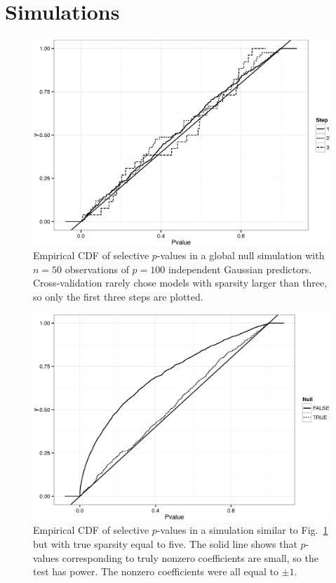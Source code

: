 \documentclass[preprint]{imsart}
\begin{document}
\section{Simulations}

\begin{figure}[h!]
  \centering
  \includegraphics[width=\textwidth]{results_cv_n50_p100_sparsity0_snr0_bystep.eps}
  \caption{\footnotesize Empirical CDF of selective $p$-values in a
    global null simulation
  with $n = 50$ observations of $p = 100$ independent Gaussian predictors.
  Cross-validation rarely chose models with sparsity larger than three,
  so only the first three steps are plotted.}
  \label{fig:globalnull}
\end{figure}


\begin{figure}[h!]
  \centering
  \includegraphics[width=\textwidth]{results_cv_n50_p100_sparsity5_snr1_bynull.eps}
  \caption{\footnotesize Empirical CDF of selective $p$-values in a
  simulation similar to Fig.~\ref{fig:globalnull} but with true
  sparsity equal to five. The solid line shows that $p$-values
  corresponding to truly nonzero coefficients are small, so the test
  has power. The nonzero coefficients were all equal to $\pm 1$.}
  \label{fig:fivesparse}
\end{figure}
\end{document}
